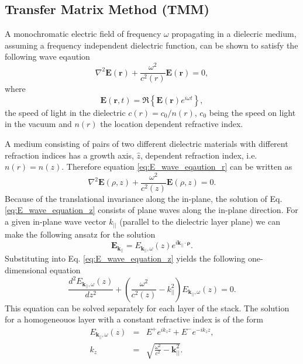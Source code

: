 \subsection{Transfer Matrix Method (TMM)}

A monochromatic electric field of frequency $\omega$ propagating
in a dielecric medium, assuming a frequency independent dielectric
function, can be shown to satisfy the following wave eqaution \begin{equation}
\nabla^{2}\mathbf{E}(\mathbf{r})+\frac{\omega^{2}}{c^{2}(r)}\mathbf{E}(\mathbf{r})=0,\label{eq:E_wave_eqaution_r}\end{equation}
where \[
\mathbf{E}(\mathbf{r},t)=\Re\left\{ \mathbf{E}(\mathbf{r})e^{i\omega t}\right\} ,\]
the speed of light in the dielectric $c(r)=c_{0}/n(r)$, $c_{0}$
being the speed on light in the vacuum and $n(r)$ the location dependent
refractive index.

A medium consisting of pairs of two different dielectric materials
with different refraction indices has a growth axis, $\hat{z}$, dependent
refraction index, i.e. $n(r)=n(z)$. Therefore equation \ref{eq:E_wave_eqaution_r}
can be written as\begin{equation}
\nabla^{2}\mathbf{E}(\rho,z)+\frac{\omega^{2}}{c^{2}(z)}\mathbf{E}(\rho,z)=0.\label{eq:E_wave_equation_z}\end{equation}
Because of the translational invariance along the in-plane, the solution
of Eq. \ref{eq:E_wave_equation_z} consists of plane waves along the
in-plane direction. For a given in-plane wave vector $k_{||}$ (parallel
to the dielectric layer plane) we can make the following ansatz for
the solution \begin{equation}
\mathbf{E}_{\mathbf{k}_{||}}=E_{\mathbf{k}_{||},\omega}(z)e^{i\mathbf{k}_{||}\cdot\mathbf{\rho}}.\end{equation}
Substituting into Eq. \ref{eq:E_wave_equation_z} yields the following
one-dimensional equation\begin{equation}
\frac{d^{2}E_{\mathbf{k}_{||},\omega}(z)}{dz^{2}}+\left(\frac{\omega^{2}}{c^{2}(z)}-k_{||}^{2}\right)E_{\mathbf{k}_{||},\omega}(z)=0.\end{equation}
This equation can be solved separately for each layer of the stack.
The solution for a homogeneouos layer with a constant refractive index
is of the form\begin{eqnarray}
E_{\mathbf{k}_{||},\omega}(z) & = & E^{+}e^{ik_{z}z}+E^{-}e^{-ik_{z}z},\nonumber \\
k_{z} & = & \sqrt{\frac{\omega^{2}}{c^{2}}-\mathbf{k}_{||}^{2}}.\end{eqnarray}



